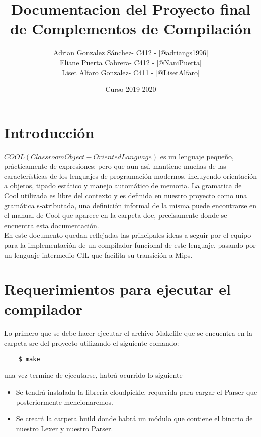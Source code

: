 \documentclass[a4paper, 12pt]{article}
\begin{document}
\title{Documentacion del Proyecto final de Complementos de Compilación}
\date{Curso 2019-2020}

\author{  
	Adrian Gonzalez Sánchez- C412 - [@adriangs1996]\\
	Eliane Puerta Cabrera- C412 - [@NaniPuerta]\\
	Liset Alfaro Gonzalez- C411 - [@LisetAlfaro]\\
  }

\maketitle

\section{Introducción}
$COOL (Classroom Object-Oriented Language)$ es un lenguaje pequeño, prácticamente de expresiones; pero que aun así, 
mantiene muchas de las características de los lenguajes de programación modernos, 
incluyendo orientación a objetos, tipado estático y manejo automático de memoria. 
La gramatica de Cool utilizada es libre del contexto y es definida en nuestro proyecto como 
una gram\'atica s-atributada, una definici\'on informal de la misma
puede encontrarse en el manual de Cool que aparece en la carpeta doc, precisamente donde se encuentra esta documentación.\\
En este documento quedan reflejadas las principales ideas a seguir por el equipo para 
la implementación de un compilador funcional de este lenguaje, 
pasando por un lenguaje intermedio CIL que facilita su transición a Mips.

\section{Requerimientos para ejecutar el compilador}
Lo primero que se debe hacer ejecutar el archivo Makefile que se encuentra en la carpeta src del proyecto utilizando el siguiente
comando:
\begin{verbatim}
	$ make
\end{verbatim}

una vez termine de ejecutarse, habr\'a ocurrido lo siguiente
\begin{itemize}
	\item Se tendr\'a instalada la librería cloudpickle, requerida para cargar el Parser que posteriormente mencionaremos.
	\item Se crear\'a la carpeta build donde habr\'a un m\'odulo que contiene el binario de nuestro Lexer y nuestro Parser.
\end{itemize}
\end{document}
